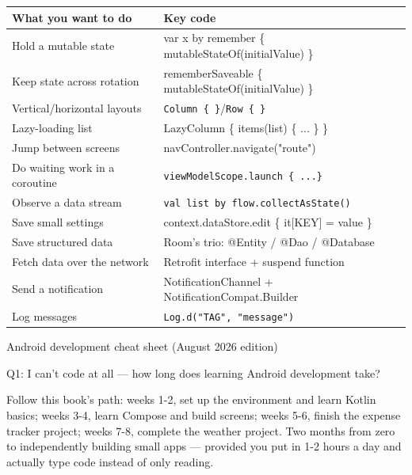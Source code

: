 


\begin{center}
\begin{tabularx}{\linewidth}{|X|X|}
\hline
\textbf{What you want to do} & \textbf{Key code} \tabularnewline
\hline
Hold a mutable state & var x by remember \{ mutableStateOf(initialValue) \} \tabularnewline
Keep state across rotation & rememberSaveable \{ mutableStateOf(initialValue) \} \tabularnewline
Vertical/horizontal layouts & \texttt{Column \{ \}}/\texttt{Row \{ \}} \tabularnewline
Lazy-loading list & LazyColumn \{ items(list) \{ ... \} \} \tabularnewline
Jump between screens & navController.navigate("route") \tabularnewline
Do waiting work in a coroutine & \texttt{viewModelScope.\allowbreak launch \{ .\allowbreak .\allowbreak .\allowbreak  \}} \tabularnewline
Observe a data stream & \texttt{val list by flow.\allowbreak collectAsState()} \tabularnewline
Save small settings & context.dataStore.edit \{ it[KEY] = value \} \tabularnewline
Save structured data & Room's trio: @Entity / @Dao / @Database \tabularnewline
Fetch data over the network & Retrofit interface + suspend function \tabularnewline
Send a notification & NotificationChannel + NotificationCompat.Builder \tabularnewline
Log messages & \texttt{Log.\allowbreak d("TAG", "message")} \tabularnewline
\hline
\end{tabularx}
\end{center}

\begin{center}\small\color{gray}Android development cheat sheet (August 2026 edition)\end{center}


Q1: I can't code at all — how long does learning Android development take?

Follow this book's path: weeks 1-2, set up the environment and learn Kotlin basics; weeks 3-4, learn Compose and build screens; weeks 5-6, finish the expense tracker project; weeks 7-8, complete the weather project. Two months from zero to independently building small apps — provided you put in 1-2 hours a day and actually type code instead of only reading.

